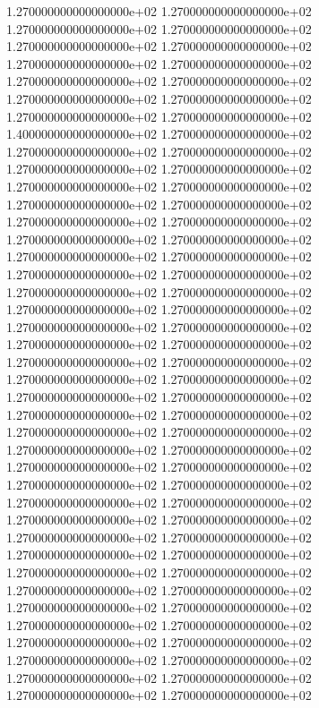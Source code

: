 1.270000000000000000e+02 1.270000000000000000e+02 1.270000000000000000e+02 1.270000000000000000e+02 1.270000000000000000e+02 1.270000000000000000e+02 1.270000000000000000e+02 1.270000000000000000e+02 1.270000000000000000e+02 1.270000000000000000e+02 1.270000000000000000e+02 1.270000000000000000e+02 1.270000000000000000e+02 1.270000000000000000e+02 1.400000000000000000e+02 1.270000000000000000e+02 1.270000000000000000e+02 1.270000000000000000e+02 1.270000000000000000e+02 1.270000000000000000e+02 1.270000000000000000e+02 1.270000000000000000e+02 1.270000000000000000e+02 1.270000000000000000e+02 1.270000000000000000e+02 1.270000000000000000e+02 1.270000000000000000e+02 1.270000000000000000e+02 1.270000000000000000e+02 1.270000000000000000e+02 1.270000000000000000e+02 1.270000000000000000e+02 1.270000000000000000e+02 1.270000000000000000e+02 1.270000000000000000e+02 1.270000000000000000e+02 1.270000000000000000e+02 1.270000000000000000e+02 1.270000000000000000e+02 1.270000000000000000e+02 1.270000000000000000e+02 1.270000000000000000e+02 1.270000000000000000e+02 1.270000000000000000e+02 1.270000000000000000e+02 1.270000000000000000e+02 1.270000000000000000e+02 1.270000000000000000e+02 1.270000000000000000e+02 1.270000000000000000e+02 1.270000000000000000e+02 1.270000000000000000e+02 1.270000000000000000e+02 1.270000000000000000e+02 1.270000000000000000e+02 1.270000000000000000e+02 1.270000000000000000e+02 1.270000000000000000e+02 1.270000000000000000e+02 1.270000000000000000e+02 1.270000000000000000e+02 1.270000000000000000e+02 1.270000000000000000e+02 1.270000000000000000e+02 1.270000000000000000e+02 1.270000000000000000e+02 1.270000000000000000e+02 1.270000000000000000e+02 1.270000000000000000e+02 1.270000000000000000e+02 1.270000000000000000e+02 1.270000000000000000e+02 1.270000000000000000e+02 1.270000000000000000e+02 1.270000000000000000e+02 1.270000000000000000e+02 1.270000000000000000e+02 1.270000000000000000e+02 1.270000000000000000e+02 1.270000000000000000e+02
